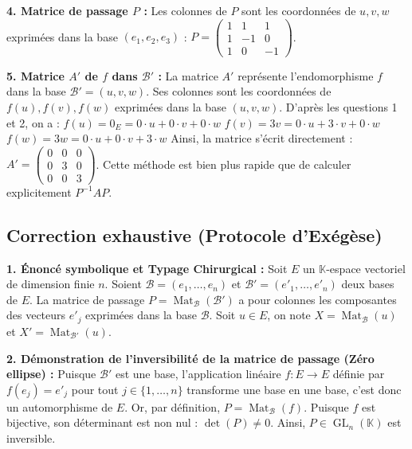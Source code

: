 \documentclass{report}
\begin{document}
\textbf{4. Matrice de passage $P$ :}
Les colonnes de $P$ sont les coordonnées de $u, v, w$ exprimées dans la base $(e_1, e_2, e_3)$ :
$P = \begin{pmatrix} 1 & 1 & 1 \\ 1 & -1 & 0 \\ 1 & 0 & -1 \end{pmatrix}$.

\textbf{5. Matrice $A'$ de $f$ dans $\mathcal{B}'$ :}
La matrice $A'$ représente l'endomorphisme $f$ dans la base $\mathcal{B}' = (u, v, w)$.
Ses colonnes sont les coordonnées de $f(u), f(v), f(w)$ exprimées dans la base $(u, v, w)$.
D'après les questions 1 et 2, on a :
$f(u) = 0_E = 0\cdot u + 0\cdot v + 0\cdot w$
$f(v) = 3v = 0\cdot u + 3\cdot v + 0\cdot w$
$f(w) = 3w = 0\cdot u + 0\cdot v + 3\cdot w$
Ainsi, la matrice s'écrit directement :
$A' = \begin{pmatrix} 0 & 0 & 0 \\ 0 & 3 & 0 \\ 0 & 0 & 3 \end{pmatrix}$.
Cette méthode est bien plus rapide que de calculer explicitement $P^{-1} A P$.







\subsection*{Correction exhaustive (Protocole d'Exégèse)}

\textbf{1. Énoncé symbolique et Typage Chirurgical :}
Soit $E$ un $\mathbb{K}$-espace vectoriel de dimension finie $n$. Soient $\mathcal{B} = (e_1, \dots, e_n)$ et $\mathcal{B}' = (e'_1, \dots, e'_n)$ deux bases de $E$.
La matrice de passage $P = \operatorname{Mat}_{\mathcal{B}}(\mathcal{B}')$ a pour colonnes les composantes des vecteurs $e'_j$ exprimées dans la base $\mathcal{B}$.
Soit $u \in E$, on note $X = \operatorname{Mat}_{\mathcal{B}}(u)$ et $X' = \operatorname{Mat}_{\mathcal{B}'}(u)$.

\textbf{2. Démonstration de l'inversibilité de la matrice de passage (Zéro ellipse) :}
Puisque $\mathcal{B}'$ est une base, l'application linéaire $f : E \to E$ définie par $f(e_j) = e'_j$ pour tout $j \in \{1, \dots, n\}$ transforme une base en une base, c'est donc un automorphisme de $E$.
Or, par définition, $P = \operatorname{Mat}_{\mathcal{B}}(f)$.
Puisque $f$ est bijective, son déterminant est non nul : $\det(P) \neq 0$.
Ainsi, $P \in \operatorname{GL}_n(\mathbb{K})$ est inversible.
\end{document}
